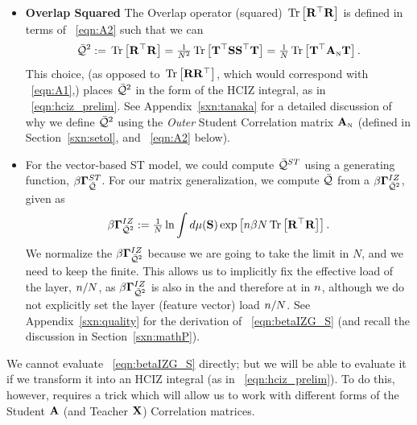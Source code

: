 \begin{itemize}
\item
 \textbf{Overlap Squared}
 The Overlap operator (squared)  $\mbox{}\operatorname{Tr}\left[\mathbf{R}^{\top}\mathbf{R}\right]$ is defined  in terms of \EQN~\ref{eqn:A2} such
 that we can 
\begin{align}
  \label{eqn:TraceR2withA2}
  \bar{\mathcal{Q}}^{2} :=\mbox{}\operatorname{Tr}\left[\mathbf{R}^{\top}\mathbf{R}\right]
  =\tfrac{1}{N^{2}}\mbox{}\operatorname{Tr}\left[{\mathbf{T}}^{\top}{\mathbf{S}}{\mathbf{S}}^{\top}{\mathbf{T}}\right]
  =\tfrac{1}{N}\mbox{}\operatorname{Tr}\left[{\mathbf{T}}^{\top}{\mathbf{A}}_{\text{\tiny N}}{\mathbf{T}}\right]  .
\end{align}
This choice, (as opposed to $\mbox{}\operatorname{Tr}\left[\mathbf{R}\mathbf{R}^{\top}\right]$, which would correspond with \EQN~\ref{eqn:A1},) places $\bar{\mathcal{Q}}^{2}$ in the form of the HCIZ integral, as in \EQN~\ref{eqn:hciz_prelim}.
See Appendix~\ref{sxn:tanaka} for a detailed discussion of why we define $\bar{\mathcal{Q}}^{2}$ using the \emph{Outer} Student Correlation matrix ${\mathbf{A}}_{\text{\tiny N}}$ (defined in Section~\ref{sxn:setol}, and  \EQN~\ref{eqn:A2} below).
\item
 \textbf{\GeneratingFunction}
For the vector-based ST model, we could compute $\bar{\mathcal{Q}}^{ST}$ using a generating function, $\beta\mathbf{\Gamma}^{ST}_{\bar{\mathcal{Q}}}$.
For our matrix generalization, we compute $\bar{\mathcal{Q}}$ from a \emph{\LayerQualitySquared \GeneratingFunction} $\beta\mathbf{\Gamma}^{IZ}_{\bar{\mathcal{Q}}^{2}}$, given as
\begin{align}
  \label{eqn:betaIZG_S}
  \beta\mathbf{\Gamma}^{IZ}_{\bar{\mathcal{Q}}^{2}}:=  \tfrac{1}{N}\ln \int d\mu({\mathbf{S}}) \exp\left[n\beta N\mbox{}\operatorname{Tr}\left[\mathbf{R}^{\top}\mathbf{R}\right]\right] .
\end{align}
We normalize the $\beta\mathbf{\Gamma}^{IZ}_{\bar{\mathcal{Q}}^{2}}$ because we are going to take the \LargeN limit in $N$, and we need to keep the \LayerQuality finite.  This allows us to implicitly fix the effective load of the layer, $n/N$, as $\beta\mathbf{\Gamma}^{IZ}_{\bar{\mathcal{Q}}^{2}}$ is also in the \ThermodynamicLimit and therefore at \LargeN in $n$, although we do not explicitly set the layer (feature vector) load $n/N$.
See Appendix~\ref{sxn:quality} for the derivation of \EQN~\ref{eqn:betaIZG_S} (and recall the discussion in Section~\ref{sxn:mathP}). 
\end{itemize}

We cannot evaluate \EQN~\ref{eqn:betaIZG_S} directly; but we will be able to evaluate it if we transform it into an HCIZ integral (as in \EQN~\ref{eqn:hciz_prelim}). To do this, however, requires a trick which will allow us to work with different forms of the Student $\mathbf{A}$ (and Teacher $\mathbf{X}$) Correlation matrices.

